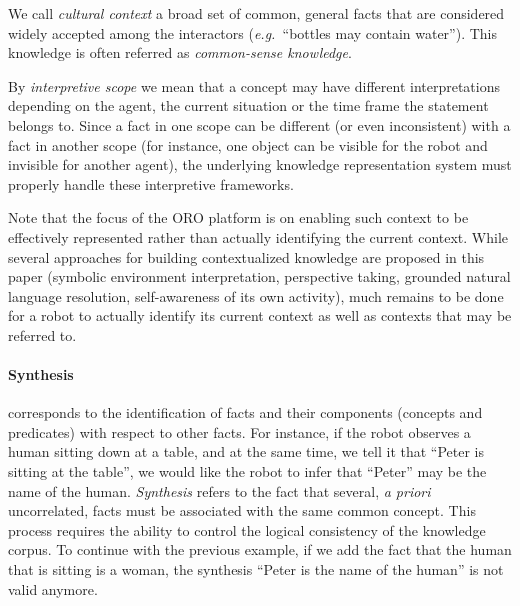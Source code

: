 \documentclass[twocolumn]{svjour3}
\newcommand{\eg}{{\textit{e.g.~}}}
\begin{document}
We call \textit{cultural context} a broad set of common, general facts that are
considered widely accepted among the interactors (\eg ``bottles may contain
water''). This knowledge is often referred as \emph{common-sense knowledge}.

By \emph{interpretive scope} we mean that a concept may have different
interpretations depending on the agent, the current situation or the time frame
the statement belongs to. Since a fact in one scope can be different (or even
inconsistent) with a fact in another scope (for instance, one object can be
visible for the robot and invisible for another agent), the underlying
knowledge representation system must properly handle these interpretive
frameworks.

Note that the focus of the ORO platform is on enabling such context to be
effectively represented rather than actually identifying the current context.
While several approaches for building contextualized knowledge are proposed in this
paper (symbolic environment interpretation, perspective taking, grounded
natural language resolution, self-awareness of its own activity), much remains
to be done for a robot to actually identify its current context as well as
contexts that may be referred to.

\paragraph{Synthesis} corresponds to the identification of facts and their
components (concepts and predicates) with respect to other facts. For instance,
if the robot observes a human sitting down at a table, and at the same time, we
tell it that ``Peter is sitting at the table'', we would like the robot to
infer that ``Peter'' may be the name of the human. \textit{Synthesis}
refers to the fact that several, \textit{a priori} uncorrelated, facts
must be associated with the same common concept. This process requires the
ability to control the logical consistency of the knowledge corpus. To
continue with the previous example,  if we add the fact that the human that
is sitting is a woman, the synthesis ``Peter is the name of the human'' is
not valid anymore.
\end{document}
